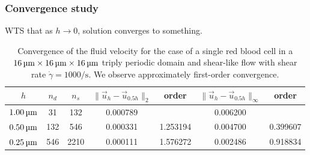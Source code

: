 \subsubsection{Convergence study}
\bgroup\color{red}
WTS that as $h\to 0$, solution converges to something.
\egroup

\begin{table}
    \begin{center}
        \begingroup
        \setlength{\tabcolsep}{9pt}
        \renewcommand{\arraystretch}{1.5}
        \begin{tabular}{ccc|cc|cc}
                                                                                                                                         \\ \toprule
            $h$       & $n_d$ & $n_s$ & $\|\vec{u}_h-\vec{u}_{0.5h}\|_2$ & order    & $\|\vec{u}_h-\vec{u}_{0.5h}\|_{\infty}$ & order    \\ \midrule
            $1.00\um$ & 31    & 132   & 0.000789                         &          & 0.006200                                &          \\
            $0.50\um$ & 132   & 546   & 0.000331                         & 1.253194 & 0.004700                                & 0.399607 \\
            $0.25\um$ & 546   & 2210  & 0.000111                         & 1.576272 & 0.002486                                & 0.918834 \\ \bottomrule
        \end{tabular}
        \endgroup
    \end{center}
    \caption{%
        Convergence of the fluid velocity for the case of a single red blood
        cell in a $16\um\times16\um\times16\um$ triply periodic domain and
        shear-like flow with shear rate $\dot{\gamma} = 1000\si{\per\second}$.
        We observe approximately first-order convergence.
    }
\end{table}

